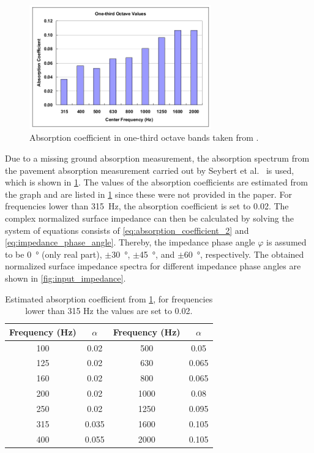 \begin{figure}[H]
	\centering
	\includegraphics[width=0.7\textwidth]{fig/chap4/impedance/absorption_spectrum.png}
	\caption{Absorption coefficient in one-third octave bands taken from \cite{Seybert2008MeasurementOP}.}
	\label{fig:ground_absorption}
\end{figure}

Due to a missing ground absorption measurement, the absorption spectrum from the pavement absorption measurement carried out by Seybert et al.\ \cite{Seybert2008MeasurementOP} is used, which is shown in \cref{fig:ground_absorption}.
The values of the absorption coefficients are estimated from the graph and are listed in \cref{tab:absorption_coefficient} since these were not provided in the paper. For frequencies lower than \SI{315}{\hertz}, the absorption coefficient is set to 0.02. The complex normalized surface impedance can then be calculated by solving the system of equations consists of \cref{eq:absorption_coefficient_2} and \cref{eq:impedance_phase_angle}. Thereby, the impedance phase angle $\varphi$ is assumed to be \SI{0}{\degree} (only real part), $\pm$\SI{30}{\degree}, $\pm$\SI{45}{\degree}, and $\pm$\SI{60}{\degree}, respectively. The obtained normalized surface impedance spectra for different impedance phase angles are shown in \cref{fig:input_impedance}.

\begin{table}[H]
	\centering
	\caption{Estimated absorption coefficient from \cref{fig:ground_absorption}, for frequencies lower than 315 Hz the values are set to 0.02.}
	\label{tab:absorption_coefficient}
	\begin{tabular}{cccc}
		\toprule
		Frequency (Hz) & $\alpha$ & Frequency (Hz) & $\alpha$ \\
		\midrule
		100 & 0.02 & 500 & 0.05 \\
		125 & 0.02 & 630 & 0.065 \\
		160 & 0.02 & 800 & 0.065 \\
		200 & 0.02 & 1000 & 0.08 \\
		250 & 0.02 & 1250 & 0.095 \\
		315 & 0.035 & 1600 & 0.105 \\
		400 & 0.055 & 2000 & 0.105 \\
		\bottomrule
	\end{tabular}
\end{table}

